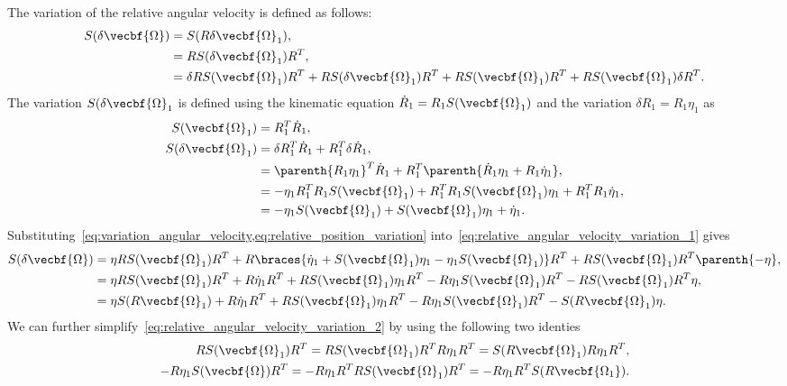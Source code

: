 \documentclass[11pt, reqno]{article}    %
\begin{document}
The variation of the relative angular velocity is defined as follows:
\begin{align}\label{eq:relative_angular_velocity_variation_1}
    S(\delta \vecbf{\Omega}) &= S(R \delta \vecbf{\Omega}_1) , \nonumber\\
    &= R S(\delta \vecbf{\Omega}_1) R^T , \nonumber \\
    &= \delta R S(\vecbf{\Omega}_1) R^T  + R S(\delta \vecbf{\Omega}_1) R^T + R S(\vecbf{\Omega}_1)R^T + R S(\vecbf{\Omega}_1) \delta R^T .
\end{align}
The variation \( S(\delta \vecbf{\Omega}_1\) is defined using the kinematic equation \( \dot{R}_1 = R_1 S(\vecbf{\Omega}_1)\) and the variation \( \delta R_1 = R_1 \eta_1 \) as 
\begin{align}\label{eq:variation_angular_velocity}
    S(\vecbf{\Omega}_1) &= R_1^T \dot{R}_1 , \nonumber\\
    S(\delta \vecbf{\Omega}_1) &= \delta R_1^T \dot{R}_1 + R_1^T \delta \dot{R}_1 ,\nonumber \\
    &= \parenth{R_1 \eta_1}^T \dot{R}_1 + R_1^T \parenth{\dot{R}_1 \eta_1 + R_1 \dot{\eta}_1} , \nonumber\\
    &= -\eta_1 R_1^T R_1 S(\vecbf{\Omega}_1) + R_1^T R_1 S(\vecbf{\Omega}_1) \eta_1 + R_1^T R_1 \dot{\eta}_1, \nonumber\\
    &= - \eta_1 S(\vecbf{\Omega}_1) + S(\vecbf{\Omega}_1) \eta_1 + \dot{\eta}_1 .
\end{align}
Substituting~\cref{eq:variation_angular_velocity,eq:relative_position_variation} into~\cref{eq:relative_angular_velocity_variation_1} gives
\begin{align}\label{eq:relative_angular_velocity_variation_2}
    S(\delta \vecbf{\Omega}) &= \eta R S( \vecbf{\Omega}_1) R^T + R \braces{\dot{\eta}_1 + S(\vecbf{\Omega}_1) \eta_1 - \eta_1 S(\vecbf{\Omega}_1)} R^T + R S( \vecbf{\Omega}_1) R^T \parenth{- \eta} , \nonumber \\
    &= \eta R S(\vecbf{\Omega}_1)R^T + R \dot{\eta}_1 R^T + R S(\vecbf{\Omega}_1) \eta_1 R^T - R \eta_1 S(\vecbf{\Omega}_1)R^T - R S(\vecbf{\Omega}_1) R^T \eta , \nonumber\\
    &= \eta S(R \vecbf{\Omega}_1) + R \dot{\eta}_1 R^T + R S(\vecbf{\Omega}_1)\eta_1 R^T - R \eta_1 S(\vecbf{\Omega}_1) R^T - S(R \vecbf{\Omega}_1) \eta .
\end{align}
We can further simplify~\cref{eq:relative_angular_velocity_variation_2} by using the following two identies
\begin{align}
    R S(\vecbf{\Omega}_1)R^T = RS(\vecbf{\Omega}_1) R^T R \eta_1 R^T = S(R \vecbf{\Omega}_1) R \eta_1 R^T , \label{eq:RSeta_identity_1}\\
    -R \eta_1 S(\vecbf{\Omega})R^T = - R \eta_1 R^T R S(\vecbf{\Omega}_1)R^T = -R \eta_1 R^T S(R \vecbf{\Omega_1}) . \label{eq:RSeta_identity_2}
\end{align}
\end{document}
